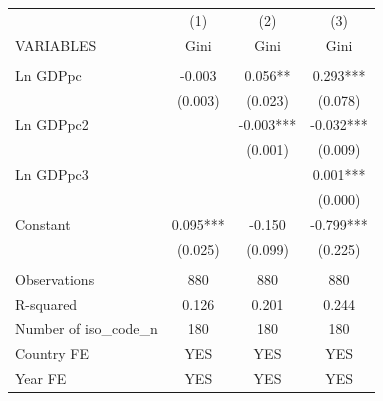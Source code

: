 \begin{tabular}{lccc} \hline
 & (1) & (2) & (3) \\
VARIABLES & Gini & Gini & Gini \\ \hline
 &  &  &  \\
Ln GDPpc & -0.003 & 0.056** & 0.293*** \\
 & (0.003) & (0.023) & (0.078) \\
Ln GDPpc2 &  & -0.003*** & -0.032*** \\
 &  & (0.001) & (0.009) \\
Ln GDPpc3 &  &  & 0.001*** \\
 &  &  & (0.000) \\
Constant & 0.095*** & -0.150 & -0.799*** \\
 & (0.025) & (0.099) & (0.225) \\
 &  &  &  \\
Observations & 880 & 880 & 880 \\
R-squared & 0.126 & 0.201 & 0.244 \\
Number of iso\_code\_n & 180 & 180 & 180 \\
Country FE & YES & YES & YES \\
 Year FE & YES & YES & YES \\ \hline
\end{tabular}
